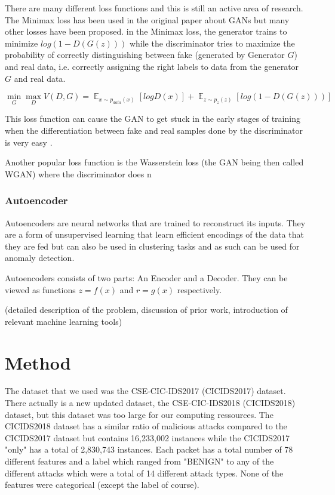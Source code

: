 \documentclass[]{article}
\DeclareMathOperator{\E}{\mathbb{E}}
\begin{document}
	 There are many different loss functions and this is still an active area of research. The Minimax loss has been used in the original paper about GANs but many other losses have been proposed. in the Minimax loss, the generator trains to minimize $log(1-D(G(z)))$ while the discriminator tries to maximize the probability of correctly distinguishing between fake (generated by Generator $G$) and real data, i.e. correctly assigning the right labels to data from the generator $G$ and real data. \cite{https://doi.org/10.48550/arxiv.1406.2661}
	 
	 \begin{equation}
	 	\min_G \max_D V(D, G) = \E_{x\sim p_{data}(x)}[logD(x)] + \E_{z\sim p_z (z)}[log(1 - D(G(z)))] 
	 \end{equation}
	 
	 This loss function can cause the GAN to get stuck in the early stages of training when the differentiation between fake and real samples done by the discriminator is very easy \cite{https://doi.org/10.48550/arxiv.1406.2661}. 
	 
	 Another popular loss function is the Wasserstein loss (the GAN being then called WGAN) where the discriminator does n
 	  
 	 \subsubsection{Autoencoder}
 	  
 	  Autoencoders are neural networks that are trained to reconstruct its inputs. They are a form of unsupervised learning that learn efficient encodings of the data that they are fed but can also be used in clustering tasks and as such can be used for anomaly detection. 
 	  
 	  Autoencoders consists of two parts: An Encoder and a Decoder. They can be viewed as functions $z = f(x)$ and $r = g(x)$ respectively. 
 	  
 	  	(detailed description of the problem, discussion of prior work, introduction of relevant machine learning tools)
	 \section{Method}
	 The dataset that we used was the CSE-CIC-IDS2017 (CICIDS2017) dataset. There actually is a new updated dataset, the CSE-CIC-IDS2018 (CICIDS2018) dataset, but this dataset was too large for our computing ressources. The CICIDS2018 dataset has a similar ratio of malicious attacks compared to the CICIDS2017 dataset but contains 16,233,002 instances while the CICIDS2017 "only" has a total of 2,830,743 instances. Each packet has a total number of 78 different features and a label which ranged from "BENIGN" to any of the different attacks which were a total of 14 different attack types. None of the features were categorical (except the label of course). 
	 \newline
	 
\end{document}
